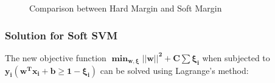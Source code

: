 \documentclass[11pt]{article}
\begin{document}
\setlength{\fboxsep}{1.3pt}%
\setlength{\fboxrule}{1pt}%
\begin{figure}[h]
    \centering
    \qquad
    \caption{Comparison between Hard Margin and Soft Margin}%
    \label{fig:SoftMarginsvsHardMargins}%
\end{figure}

\subsubsection{\textbf{Solution for Soft SVM}}

The new objective function $\mathbf{\min_{w, \xi}{||w||^2}+C\sum{\xi_i}}$ when subjected to $\mathbf{y_i(w^{T}x_{i}+b \geq 1-\xi_i)}$ can be solved using Lagrange's method:
\end{document}

